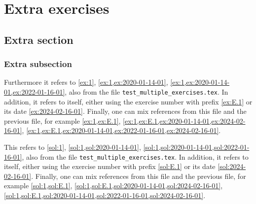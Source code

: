 \documentclass[oneside]{book}
\begin{document}
\chapter{Extra exercises}

\section{Extra section}

\subsection{Extra subsection}

\begin{exercise}[examdate={February 16, 2024}, examproblemnumber={1}, examproblemid={2024-02-16-01}]
%
Furthermore it refers to \cref{ex:1}, \cref{ex:1,ex:2020-01-14-01}, \cref{ex:1,ex:2020-01-14-01,ex:2022-01-16-01}, also from the file \texttt{test\_multiple\_exercises.tex}.
In addition, it refers to itself, either using the exercise number with prefix \cref{ex:E.1} or its date \cref{ex:2024-02-16-01}.
Finally, one can mix references from this file and the previous file, for example \cref{ex:1,ex:E.1}, \cref{ex:1,ex:E.1,ex:2020-01-14-01,ex:2024-02-16-01}, \cref{ex:1,ex:E.1,ex:2020-01-14-01,ex:2022-01-16-01,ex:2024-02-16-01}.
\end{exercise}

\begin{solution}
This refers to \cref{sol:1}, \cref{sol:1,sol:2020-01-14-01}, \cref{sol:1,sol:2020-01-14-01,sol:2022-01-16-01}, also from the file \texttt{test\_multiple\_exercises.tex}.
In addition, it refers to itself, either using the exercise number with prefix \cref{sol:E.1} or its date \cref{sol:2024-02-16-01}.
Finally, one can mix references from this file and the previous file, for example \cref{sol:1,sol:E.1}, \cref{sol:1,sol:E.1,sol:2020-01-14-01,sol:2024-02-16-01}, \cref{sol:1,sol:E.1,sol:2020-01-14-01,sol:2022-01-16-01,sol:2024-02-16-01}.
\end{solution}
\end{document}
